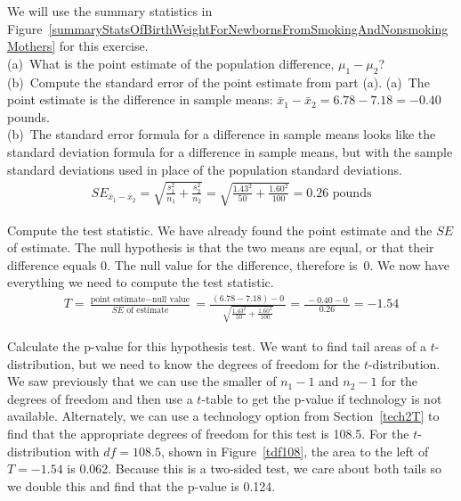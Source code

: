 \begin{examplewrap}
\begin{nexample}
{We will use the summary statistics in Figure~\ref{summaryStatsOfBirthWeightForNewbornsFromSmokingAndNonsmokingMothers} for this exercise.
\\ (a)~What is the point estimate of the population difference, $\mu_{1} - \mu_{2}$? 
\\(b)~Compute the standard error of the point estimate from part (a).}
(a)~The point estimate is the difference in sample means: $\bar{x}_{1} - \bar{x}_{2} = 6.78-7.18=-0.40$ pounds. \\
(b)~The standard error formula for a difference in sample means looks like the standard deviation formula for a difference in sample means, but with the sample standard deviations used in place of the population standard deviations.
\begin{eqnarray*}
SE_{\bar{x}_1-\bar{x}_2} = \sqrt{\frac{s_1^2}{n_1} + \frac{s_2^2}{n_2}}
	= \sqrt{\frac{1.43^2}{50} + \frac{1.60^2}{100}}
	= 0.26 \text{ pounds}
\end{eqnarray*}
\end{nexample}
\end{examplewrap}


\begin{examplewrap}
\begin{nexample}{Compute the test statistic. } \label{babySmokeHTForWeightComputePValueAndEvalHT}
We have already found the point estimate and the $SE$ of estimate.  The null hypothesis is that the two means are equal, or that their difference equals 0.  The null value for the difference, therefore is~0.  We now have everything we need to compute the test statistic.
\begin{eqnarray*}
T = \frac{\text{point estimate} - \text{null value}}{SE \text{ of estimate}} =  \frac{\ (6.78 - 7.18) - 0\ }{\sqrt{\frac{1.43^2}{50} + \frac{1.60^2}{100}}} = \frac{\ -0.40 - 0\ }{0.26} = -1.54
\end{eqnarray*}
\end{nexample}
\end{examplewrap}

\begin{examplewrap}
\begin{nexample}{Calculate the p-value for this hypothesis test.}
\label{pictureOfPValueForEstimateOfDiffOfMeansOfBirthWeights}
We want to find tail areas of a $t$-distribution, but we need to know the degrees of freedom for the $t$-distribution.  We saw previously that we can use the smaller of $n_1-1$ and $n_2-1$ for the degrees of freedom and then use a $t$-table to get the p-value if technology is not available.  Alternately, we can use a technology option from Section~\ref{tech2T} to find that the appropriate degrees of freedom for this test is 108.5.  For the $t$-distribution with $df = 108.5$, shown in Figure~\ref{tdf108}, the area to the left of $T=-1.54$ is 0.062.  Because this is a two-sided test, we care about both tails so we double this and find that the p-value is 0.124.
\end{nexample}
\end{examplewrap}

